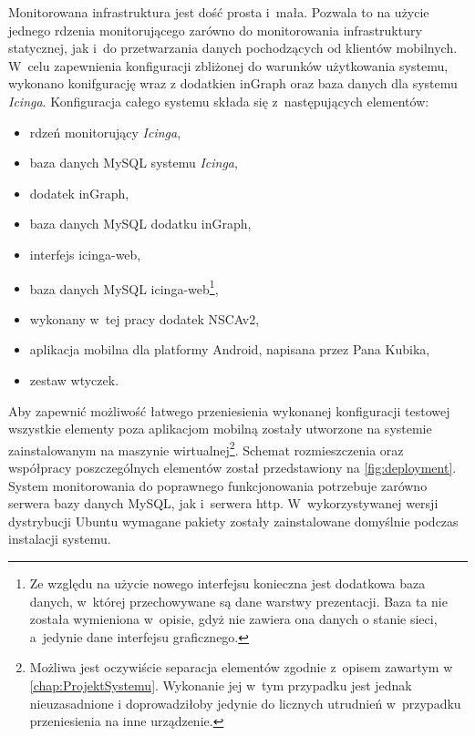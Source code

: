 Monitorowana infrastruktura jest dość prosta i~mała. Pozwala to na
użycie jednego rdzenia monitorującego zarówno do monitorowania
infrastruktury statycznej, jak i~do przetwarzania danych pochodzących
od klientów mobilnych. W~celu zapewnienia konfiguracji zbliżonej do
warunków użytkowania systemu, wykonano konifgurację wraz z dodatkien
inGraph oraz baza danych dla systemu {\em Icinga}. Konfiguracja całego
systemu składa się z~następujących elementów:

\begin{itemize}
\item rdzeń monitorujący {\em Icinga},
\item baza danych MySQL systemu {\em Icinga},
\item dodatek inGraph,
\item baza danych MySQL dodatku inGraph,
\item interfejs icinga-web,
\item baza danych MySQL icinga-web\footnote{Ze względu na użycie
    nowego interfejsu konieczna jest dodatkowa baza danych, w~której
    przechowywane są dane warstwy prezentacji. Baza ta nie została
    wymieniona w~opisie, gdyż nie zawiera ona danych o stanie sieci,
    a~jedynie dane interfejsu graficznego.},
\item wykonany w~tej pracy dodatek NSCAv2,
\item aplikacja mobilna dla platformy Android, napisana przez Pana
  Kubika,
\item zestaw wtyczek.
\end{itemize}

Aby zapewnić możliwość łatwego przeniesienia wykonanej konfiguracji
testowej wszystkie elementy poza aplikacjom mobilną zostały utworzone
na systemie zainstalowanym na maszynie wirtualnej\footnote{Możliwa
  jest oczywiście separacja elementów zgodnie z~opisem zawartym w~
  \ref{chap:ProjektSystemu}. Wykonanie jej w~tym przypadku jest jednak
  nieuzasadnione i doprowadziłoby jedynie do licznych utrudnień
  w~przypadku przeniesienia na inne urządzenie.}. Schemat
rozmieszczenia oraz współpracy poszczególnych elementów został
przedstawiony na \ref{fig:deployment}. System monitorowania do
poprawnego funkcjonowania potrzebuje zarówno serwera bazy danych
MySQL, jak i~serwera http. W~wykorzystywanej wersji dystrybucji Ubuntu
wymagane pakiety zostały zainstalowane domyślnie podczas instalacji
systemu.

